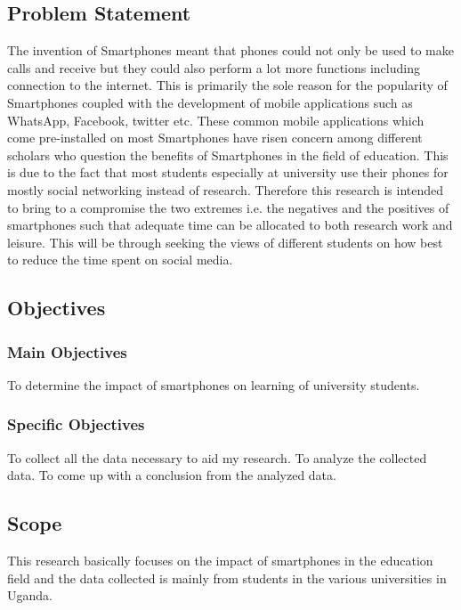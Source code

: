 \documentclass {article}
\begin{document}
\subsection{Problem Statement}
The invention of Smartphones meant that phones could not only be used to make calls and receive but they could also perform a lot more functions including connection to the internet. This is primarily the sole reason for the popularity of Smartphones coupled with the development of mobile applications such as WhatsApp, Facebook, twitter etc.
These common mobile applications which come pre-installed on most Smartphones have risen concern among different scholars who question the benefits of Smartphones in the field of education. This is due to the fact that most students especially at university use their phones for mostly social networking instead of research.
Therefore this research is intended to bring to a compromise the two extremes i.e. the negatives and the positives of smartphones such that adequate time can be allocated to both research work and leisure. This will be through seeking the views of different students on how best to reduce the time spent on social media.


\subsection{Objectives}

\subsubsection{Main Objectives}

To determine the impact of smartphones on learning of university students.
\subsubsection{Specific Objectives}
To collect all the data necessary to aid my research.
To analyze the collected data.
To come up with a conclusion from the analyzed data.



\subsection{Scope}
This research basically focuses on the impact of smartphones in the education field and the data collected is mainly from students in the various universities in Uganda.
\end{document}
